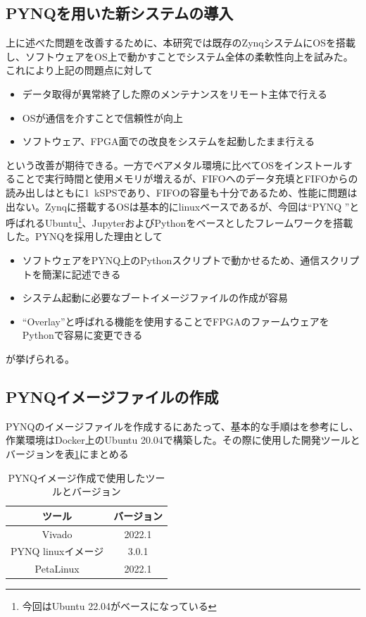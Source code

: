 \subsection{PYNQを用いた新システムの導入}
上に述べた問題を改善するために、本研究では既存のZynqシステムにOSを搭載し、ソフトウェアをOS上で動かすことでシステム全体の柔軟性向上を試みた。これにより上記の問題点に対して
\begin{itemize}
  \item データ取得が異常終了した際のメンテナンスをリモート主体で行える
  \item OSが通信を介すことで信頼性が向上
  \item ソフトウェア、FPGA面での改良をシステムを起動したまま行える
\end{itemize}
という改善が期待できる。一方でベアメタル環境に比べてOSをインストールすることで実行時間と使用メモリが増えるが、FIFOへのデータ充填とFIFOからの読み出しはともに\SI{1}{kSPS}であり、FIFOの容量も十分であるため、性能に問題は出ない。Zynqに搭載するOSは基本的にlinuxベースであるが、今回は``PYNQ \cite{Pynq}''と呼ばれるUbuntu\footnote{今回はUbuntu 22.04がベースになっている}、JupyterおよびPythonをベースとしたフレームワークを搭載した。PYNQを採用した理由として
\begin{itemize}
  \item ソフトウェアをPYNQ上のPythonスクリプトで動かせるため、通信スクリプトを簡潔に記述できる
  \item システム起動に必要なブートイメージファイルの作成が容易
  \item ``Overlay''と呼ばれる機能を使用することでFPGAのファームウェアをPythonで容易に変更できる
\end{itemize}
が挙げられる。

\subsection{PYNQイメージファイルの作成}

PYNQのイメージファイルを作成するにあたって、基本的な手順は\cite{image}を参考にし、作業環境はDocker上のUbuntu 20.04で構築した。その際に使用した開発ツールとバージョンを表\ref{PYNQ_table}にまとめる

\begin{table}[htbp]
  \centering
  \caption{PYNQイメージ作成で使用したツールとバージョン}
  \vspace{3mm}
  \begin{tabular}{cc} \hline\hline
    ツール & バージョン \\ \hline
    Vivado & 2022.1\\
    PYNQ linuxイメージ & 3.0.1\\
    PetaLinux & 2022.1\\ \hline\hline
  \end{tabular}
  \label{PYNQ_table}
\end{table}

